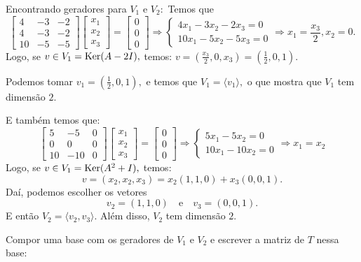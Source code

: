 \documentclass[11pt,a4paper]{article}
\begin{document}
{{\task[\pers{c}] Encontrando geradores para $V_1$ e $V_2:$
Temos que
\[
\begin{bmatrix}
4 & -3 & -2 \\ 4 & -3 & -2 \\ 10 & -5 & -5
\end{bmatrix} \begin{bmatrix}
x_1 \\ x_2 \\ x_3
\end{bmatrix} = \begin{bmatrix}
0 \\ 0 \\ 0
\end{bmatrix} \Rightarrow \begin{cases} 4x_1 - 3x_2 - 2x_3 = 0 \\ 10x_1 - 5x_2 - 5x_3 = 0 \end{cases} \Rightarrow x_1 = \frac{x_3}{2}, x_2 = 0.
\]
Logo, se $v \in V_1 = \operatorname{Ker}(A - 2I),$ temos:
$v = \left(\frac{x_3}{2}, 0, x_3\right) = \left(\frac{1}{2}, 0, 1\right).$

\medskip
\noindent
Podemos tomar $v_1 = \left(\frac{1}{2}, 0, 1\right),$ e temos que $V_1 = \langle v_1 \rangle,$ o que mostra que $V_1$ tem dimensão $2.$

\medskip
\noindent
E também temos que:
\[
\begin{bmatrix}
5 & -5 & 0 \\ 0 & 0 & 0 \\ 10 & -10 & 0
\end{bmatrix} \begin{bmatrix}
x_1 \\ x_2 \\ x_3
\end{bmatrix} = \begin{bmatrix}
0 \\ 0 \\ 0
\end{bmatrix} \Rightarrow \begin{cases} 5x_1 - 5x_2 = 0 \\ 10x_1 - 10x_2 = 0 \end{cases} \Rightarrow x_1 = x_2
\]
Logo, se $v \in V_1 = \operatorname{Ker}(A^2 + I),$ temos:
\[
v = (x_2,x_2,x_3) = x_2(1,1,0) + x_3(0,0,1).
\]
Daí, podemos escolher os vetores
\[
v_2 = (1,1,0) \quad \mbox{e} \quad v_3 = (0,0,1). 
\]
E então $V_2 = \langle v_2, v_3 \rangle.$ Além disso, $V_2$ tem dimensão $2.$ 

\task[\pers{d}] Compor uma base com os geradores de $V_1$ e $V_2$ e escrever a matriz de $T$ nessa base:

}}
\end{document}
